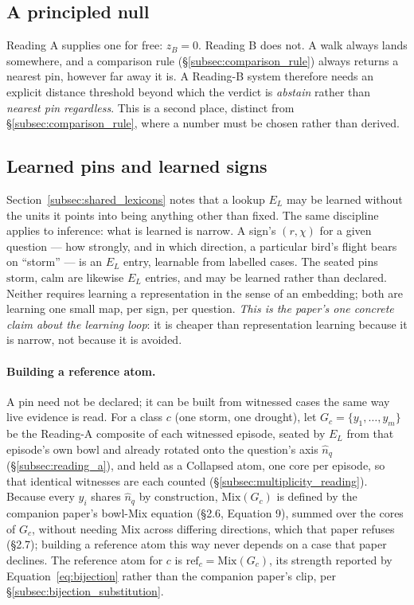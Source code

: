 \documentclass[12pt, a4paper]{article}
\begin{document}
\subsection{A principled null}
\label{subsec:the_null}
Reading A supplies one for free: $z_B=0$. Reading B does not. A walk
always lands somewhere, and a comparison rule (\S\ref{subsec:comparison_rule})
always returns a nearest pin, however far away it is. A Reading-B
system therefore needs an explicit distance threshold beyond which the
verdict is \emph{abstain} rather than \emph{nearest pin regardless}.
This is a second place, distinct from \S\ref{subsec:comparison_rule},
where a number must be chosen rather than derived.

\subsection{Learned pins and learned signs}
\label{subsec:learned_pins}
Section~\ref{subsec:shared_lexicons} notes that a lookup $E_L$ may be learned without the units it points into being anything other than
fixed. The same discipline applies to inference: what is learned is
narrow. A sign's $(r,\chi)$ for a given question --- how strongly, and
in which direction, a particular bird's flight bears on ``storm'' ---
is an $E_L$ entry, learnable from labelled cases. The seated pins
$\mathrm{storm}$, $\mathrm{calm}$ are likewise $E_L$ entries, and may
be learned rather than declared. Neither requires learning a
representation in the sense of an embedding; both are learning one
small map, per sign, per question. \emph{This is the paper's one
concrete claim about the learning loop}: it is cheaper than
representation learning because it is narrow, not because it is
avoided.

\paragraph{Building a reference atom.}
\label{par:reference_atom}
A pin need not be declared; it can be built from witnessed cases the
same way live evidence is read. For a class $c$ (one storm, one
drought), let $G_c=\{y_1,\ldots,y_m\}$ be the Reading-A composite of
each witnessed episode, seated by $E_L$ from that episode's own bowl
and already rotated onto the question's axis $\hat n_q$
(\S\ref{subsec:reading_a}), and held as a Collapsed atom, one core per
episode, so that identical witnesses are each counted
(\S\ref{subsec:multiplicity_reading}). Because every $y_i$ shares $\hat
n_q$ by construction, $\mathrm{Mix}(G_c)$ is defined by the
companion paper's bowl-Mix equation (\S2.6, Equation 9), summed over the
cores of $G_c$, without needing Mix across differing directions, which
that paper refuses (\S2.7); building a reference atom this way never
depends on a case that paper declines. The
reference atom for $c$ is $\mathrm{ref}_c=\mathrm{Mix}(G_c)$, its strength
reported by Equation~\eqref{eq:bijection} rather than the companion
paper's clip, per \S\ref{subsec:bijection_substitution}.
\end{document}
